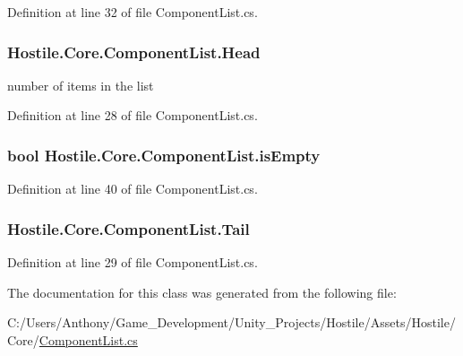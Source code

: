Definition at line 32 of file Component\-List.\-cs.

\hypertarget{class_hostile_1_1_core_1_1_component_list_af87f2970df86b355c5ab3f3de8135935}{
\subsubsection[{Head}]{ Hostile.\-Core.\-Component\-List.\-Head\hspace{0.3cm}{\ttfamily [get]}}}\label{class_hostile_1_1_core_1_1_component_list_af87f2970df86b355c5ab3f3de8135935}


number of items in the list 



Definition at line 28 of file Component\-List.\-cs.

\hypertarget{class_hostile_1_1_core_1_1_component_list_a095d4645394828fee4a4638e680a4226}{
\subsubsection[{is\-Empty}]{\setlength{\rightskip}{0pt plus 5cm}bool Hostile.\-Core.\-Component\-List.\-is\-Empty\hspace{0.3cm}{\ttfamily [get]}}}\label{class_hostile_1_1_core_1_1_component_list_a095d4645394828fee4a4638e680a4226}


Definition at line 40 of file Component\-List.\-cs.

\hypertarget{class_hostile_1_1_core_1_1_component_list_a23c81b4ac21fbb2c85fa8ea38d595c3c}{
\subsubsection[{Tail}]{ Hostile.\-Core.\-Component\-List.\-Tail\hspace{0.3cm}{\ttfamily [get]}}}\label{class_hostile_1_1_core_1_1_component_list_a23c81b4ac21fbb2c85fa8ea38d595c3c}


Definition at line 29 of file Component\-List.\-cs.



The documentation for this class was generated from the following file\-:\begin{DoxyCompactItemize}
\item 
C\-:/\-Users/\-Anthony/\-Game\-\_\-\-Development/\-Unity\-\_\-\-Projects/\-Hostile/\-Assets/\-Hostile/\-Core/\hyperlink{_component_list_8cs}{Component\-List.\-cs}\end{DoxyCompactItemize}
